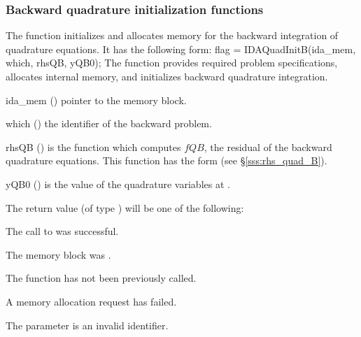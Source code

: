 \subsubsection{Backward quadrature initialization functions}
\label{sss:idaquadinitb}

The function  initializes and allocates memory for the backward
integration of quadrature equations. It has the following form:
{
flag = IDAQuadInitB(ida\_mem, which, rhsQB, yQB0);
}
{
  The function  provides required problem specifications,
  allocates internal memory, and initializes backward quadrature integration.
}
{
  \begin{args}
  \item[ida\_mem] ()
    pointer to the {\idas} memory block.
  \item[which] ()
    the identifier of the backward problem.
  \item[rhsQB] ()
    is the {\C} function which computes $fQB$, the residual of the 
    backward quadrature equations. This function has the form 
    (see \S\ref{sss:rhs_quad_B}).
  \item[yQB0] ()
    is the value of the quadrature variables at .
  \end{args}
}
{
  The return value  (of type ) will be one of the following:
  \begin{args}
  \item[\Id{IDA\_SUCCESS}]
    The call to  was successful.
  \item[\Id{IDA\_MEM\_NULL}] 
    The  memory block was .
  \item[\Id{IDA\_NO\_ADJ}]
    The function  has not been previously called.
  \item[\Id{IDA\_MEM\_FAIL}] 
    A memory allocation request has failed.
  \item[\Id{IDA\_ILL\_INPUT}]
    The parameter  is an invalid identifier.
  \end{args}
}
{}


